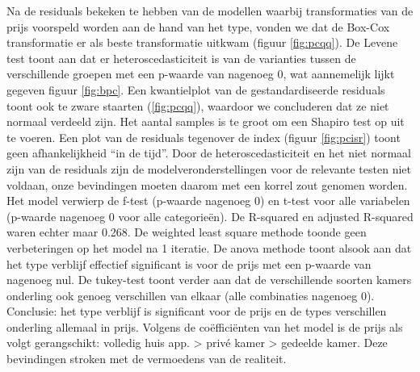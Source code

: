 \documentclass[a4paper,kulak]{kulakarticle} %
\begin{document}
Na de residuals bekeken te hebben van de modellen waarbij transformaties van de prijs voorspeld worden aan de hand van het type, vonden we dat de Box-Cox transformatie er als beste transformatie uitkwam (figuur \ref{fig:pcqq}).
De Levene test toont aan dat er heteroscedasticiteit is van de varianties tussen de verschillende groepen met een p-waarde van nagenoeg 0, wat aannemelijk lijkt gegeven figuur \ref{fig:bpc}.
Een kwantielplot van de gestandardiseerde residuals toont ook te zware staarten (\ref{fig:pcqq}), waardoor we concluderen dat ze niet normaal verdeeld zijn.
Het aantal samples is te groot om een Shapiro test op uit te voeren.
Een plot van de residuals tegenover de index (figuur \ref{fig:pcisr}) toont geen afhankelijkheid ``in de tijd''.
Door de heteroscedasticiteit en het niet normaal zijn van de residuals zijn de modelveronderstellingen voor de relevante testen niet voldaan, onze bevindingen moeten daarom met een korrel zout genomen worden.\\
Het model verwierp de f-test (p-waarde nagenoeg 0) en t-test voor alle variabelen (p-waarde nagenoeg 0 voor alle categorieën). 
De R-squared en adjusted R-squared  waren echter maar 0.268.
De weighted least square methode toonde geen verbeteringen op het model na 1 iteratie. 
De anova methode toont alsook aan dat het type verblijf effectief significant is voor de prijs met een p-waarde van nagenoeg nul.
De tukey-test toont verder aan dat de verschillende soorten kamers onderling ook genoeg verschillen van elkaar (alle combinaties nagenoeg 0). \\
Conclusie: het type verblijf is significant voor de prijs en de types verschillen onderling allemaal in prijs. Volgens de coëfficiënten van het model is de prijs als volgt gerangschikt: 
volledig huis app. > privé kamer > gedeelde kamer.
Deze bevindingen stroken met de vermoedens van de realiteit.
\end{document}
